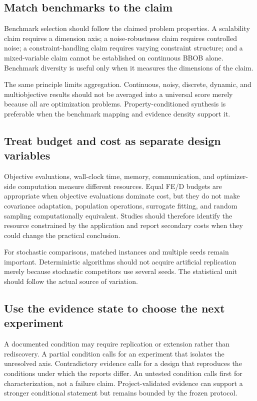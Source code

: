 \subsection{Match benchmarks to the claim}

Benchmark selection should follow the claimed problem properties. A scalability claim requires a dimension axis; a noise-robustness claim requires controlled noise; a constraint-handling claim requires varying constraint structure; and a mixed-variable claim cannot be established on continuous BBOB alone. Benchmark diversity is useful only when it measures the dimensions of the claim.

The same principle limits aggregation. Continuous, noisy, discrete, dynamic, and multiobjective results should not be averaged into a universal score merely because all are optimization problems. Property-conditioned synthesis is preferable when the benchmark mapping and evidence density support it.

\subsection{Treat budget and cost as separate design variables}

Objective evaluations, wall-clock time, memory, communication, and optimizer-side computation measure different resources. Equal FE/D budgets are appropriate when objective evaluations dominate cost, but they do not make covariance adaptation, population operations, surrogate fitting, and random sampling computationally equivalent. Studies should therefore identify the resource constrained by the application and report secondary costs when they could change the practical conclusion.

For stochastic comparisons, matched instances and multiple seeds remain important. Deterministic algorithms should not acquire artificial replication merely because stochastic competitors use several seeds. The statistical unit should follow the actual source of variation.

\subsection{Use the evidence state to choose the next experiment}

A documented condition may require replication or extension rather than rediscovery. A partial condition calls for an experiment that isolates the unresolved axis. Contradictory evidence calls for a design that reproduces the conditions under which the reports differ. An untested condition calls first for characterization, not a failure claim. Project-validated evidence can support a stronger conditional statement but remains bounded by the frozen protocol.

